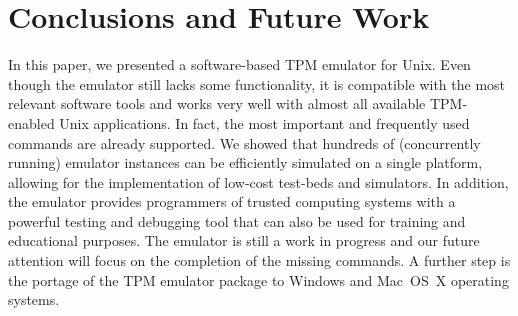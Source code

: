 \documentclass[runningheads]{llncs}
\begin{document}

\section{Conclusions and Future Work}\label{sec:conclusion}
In this paper, we presented a software-based TPM emulator for Unix. Even
though the emulator still lacks some functionality, it is compatible with
the most relevant software tools and works very well with almost all
available TPM-enabled Unix applications. In fact, the most important and
frequently used commands are already supported. We showed that hundreds of
(concurrently running) emulator instances can be efficiently simulated on
a single platform, allowing for the implementation of low-cost test-beds
and simulators. In addition, the emulator provides programmers of trusted
computing systems with a powerful testing and debugging tool that can also
be used for training and educational purposes.
The emulator is still a work in progress and our future attention will
focus on the completion of the missing commands. A further step is the portage
of the TPM emulator package to Windows and Mac~OS~X operating systems.

\end{document}
